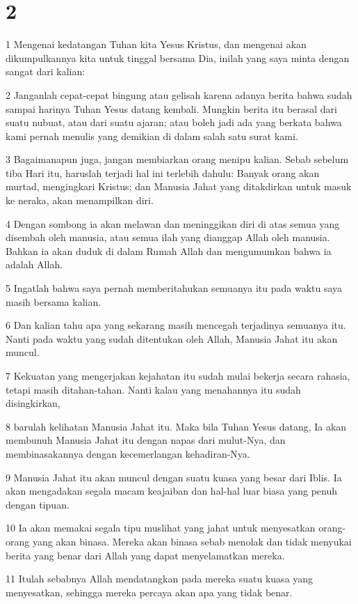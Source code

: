 \chapter{2}

\par 1 Mengenai kedatangan Tuhan kita Yesus Kristus, dan mengenai akan dikumpulkannya kita untuk tinggal bersama Dia, inilah yang saya minta dengan sangat dari kalian:
\par 2 Janganlah cepat-cepat bingung atau gelisah karena adanya berita bahwa sudah sampai harinya Tuhan Yesus datang kembali. Mungkin berita itu berasal dari suatu nubuat, atau dari suatu ajaran; atau boleh jadi ada yang berkata bahwa kami pernah menulis yang demikian di dalam salah satu surat kami.
\par 3 Bagaimanapun juga, jangan membiarkan orang menipu kalian. Sebab sebelum tiba Hari itu, haruslah terjadi hal ini terlebih dahulu: Banyak orang akan murtad, mengingkari Kristus; dan Manusia Jahat yang ditakdirkan untuk masuk ke neraka, akan menampilkan diri.
\par 4 Dengan sombong ia akan melawan dan meninggikan diri di atas semua yang disembah oleh manusia, atau semua ilah yang dianggap Allah oleh manusia. Bahkan ia akan duduk di dalam Rumah Allah dan mengumumkan bahwa ia adalah Allah.
\par 5 Ingatlah bahwa saya pernah memberitahukan semuanya itu pada waktu saya masih bersama kalian.
\par 6 Dan kalian tahu apa yang sekarang masih mencegah terjadinya semuanya itu. Nanti pada waktu yang sudah ditentukan oleh Allah, Manusia Jahat itu akan muncul.
\par 7 Kekuatan yang mengerjakan kejahatan itu sudah mulai bekerja secara rahasia, tetapi masih ditahan-tahan. Nanti kalau yang menahannya itu sudah disingkirkan,
\par 8 barulah kelihatan Manusia Jahat itu. Maka bila Tuhan Yesus datang, Ia akan membunuh Manusia Jahat itu dengan napas dari mulut-Nya, dan membinasakannya dengan kecemerlangan kehadiran-Nya.
\par 9 Manusia Jahat itu akan muncul dengan suatu kuasa yang besar dari Iblis. Ia akan mengadakan segala macam keajaiban dan hal-hal luar biasa yang penuh dengan tipuan.
\par 10 Ia akan memakai segala tipu muslihat yang jahat untuk menyesatkan orang-orang yang akan binasa. Mereka akan binasa sebab menolak dan tidak menyukai berita yang benar dari Allah yang dapat menyelamatkan mereka.
\par 11 Itulah sebabnya Allah mendatangkan pada mereka suatu kuasa yang menyesatkan, sehingga mereka percaya akan apa yang tidak benar.
